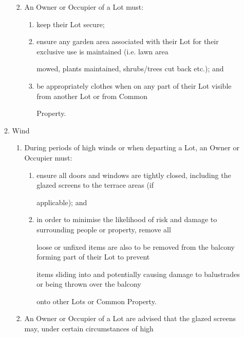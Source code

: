 \documentclass{article}
\begin{document}
\begin{enumerate}[label=\arabic*.]
\begin{enumerate}[label=\arabic{enumi}.\arabic*.]
\begin{enumerate}[label=(\arabic*)]
\begin{enumerate}[label=(\alph*)]
\end{enumerate}
\item {\fontsize{9.962}{1} An Owner or Occupier of a Lot must: }

\begin{enumerate}[label=(\alph*)]
\item {\fontsize{9.962}{1} keep their Lot secure; }

\item {\fontsize{9.962}{1} ensure any garden area associated with their Lot for their exclusive use is maintained (i.e. lawn area }

{\fontsize{10.02}{1}mowed, plants maintained, shrubs/trees cut back etc.); and }

\item {\fontsize{9.962}{1} be appropriately clothes when on any part of their Lot visible from another Lot or from Common }

{\fontsize{10.02}{1}Property. }

\end{enumerate}
\end{enumerate}
\item {\fontsize{9.99}{1} Wind }

\begin{enumerate}[label=(\arabic*)]
\item {\fontsize{9.962}{1} During periods of high winds or when departing a Lot, an Owner or Occupier must: }

\begin{enumerate}[label=(\alph*)]
\item {\fontsize{9.962}{1} ensure all doors and windows are tightly closed, including the glazed screens to the terrace areas (if }

{\fontsize{10.02}{1}applicable); and }

\item {\fontsize{9.962}{1} in order to minimise the likelihood of risk and damage to surrounding people or property, remove all }

{\fontsize{10.02}{1}loose or unfixed items are also to be removed from the balcony forming part of their Lot to prevent }

{\fontsize{10.02}{1}items sliding into and potentially causing damage to balustrades or being thrown over the balcony }

{\fontsize{10.02}{1}onto other Lots or Common Property. }

\end{enumerate}
\item {\fontsize{9.962}{1} An Owner or Occupier of a Lot are advised that the glazed screens may, under certain circumstances of high }


\end{enumerate}
\end{enumerate}
\end{enumerate}
\end{document}
